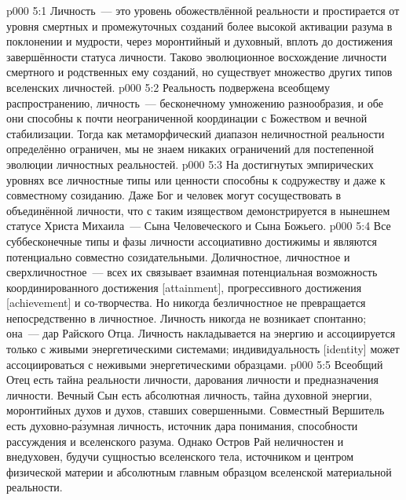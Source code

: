 \vs p000 5:1 Личность~--- это уровень обожествлённой реальности и простирается от уровня смертных и промежуточных созданий более высокой активации разума в поклонении и мудрости, через моронтийный и духовный, вплоть до достижения завершённости статуса личности. Таково эволюционное восхождение личности смертного и родственных ему созданий, но существует множество других типов вселенских личностей.
\vs p000 5:2 Реальность подвержена всеобщему распространению, личность~--- бесконечному умножению разнообразия, и обе они способны к почти неограниченной координации с Божеством и вечной стабилизации. Тогда как метаморфический диапазон неличностной реальности определённо ограничен, мы не знаем никаких ограничений для постепенной эволюции личностных реальностей.
\vs p000 5:3 На достигнутых эмпирических уровнях все личностные типы или ценности способны к содружеству и даже к совместному созиданию. Даже Бог и человек могут сосуществовать в объединённой личности, что с таким изяществом демонстрируется в нынешнем статусе Христа Михаила~--- Сына Человеческого и Сына Божьего.
\vs p000 5:4 Все суббесконечные типы и фазы личности ассоциативно достижимы и являются потенциально совместно созидательными. Доличностное, личностное и сверхличностное~--- всех их связывает взаимная потенциальная возможность координированного достижения [attainment], прогрессивного достижения [achievement] и со\hyp{}творчества. Но никогда безличностное не превращается непосредственно в личностное. Личность никогда не возникает спонтанно; она~--- дар Райского Отца. Личность накладывается на энергию и ассоциируется только с живыми энергетическими системами; индивидуальность [identity] может ассоциироваться с неживыми энергетическими образцами.
\vs p000 5:5 \pc Всеобщий Отец есть тайна реальности личности, дарования личности и предназначения личности. Вечный Сын есть абсолютная личность, тайна духовной энергии, моронтийных духов и духов, ставших совершенными. Совместный Вершитель есть духовно\hyp{}р\'азумная личность, источник дара понимания, способности рассуждения и вселенского разума. Однако Остров Рай неличностен и внедуховен, будучи сущностью вселенского тела, источником и центром физической материи и абсолютным главным образцом вселенской материальной реальности.
